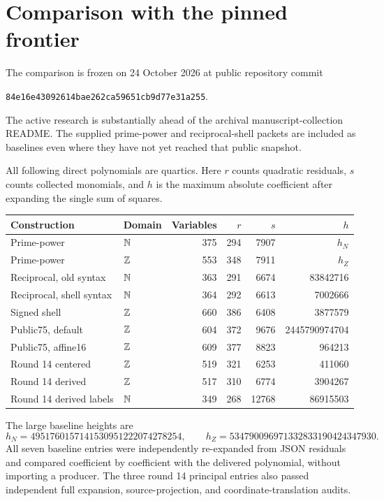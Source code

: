 \section{Comparison with the pinned frontier}
The comparison is frozen on 24 October 2026 at public repository commit
\begin{center}\small\texttt{84e16e43092614bae262ca59651cb9d77e31a255}.\end{center} The active research is substantially ahead of the archival manuscript-collection README. The supplied prime-power and reciprocal-shell packets are included as baselines even where they have not yet reached that public snapshot.

All following direct polynomials are quartics. Here $r$ counts quadratic residuals, $s$ counts collected monomials, and $h$ is the maximum absolute coefficient after expanding the single sum of squares.
\begin{center}\small
\begin{tabular}{@{}llrrrr@{}}\toprule
Construction & Domain & Variables & $r$ & $s$ & $h$\\\midrule
Prime-power & $\mathbb N$ &375&294&7907&$h_N$\\
Prime-power & $\mathbb Z$ &553&348&7911&$h_Z$\\
Reciprocal, old syntax & $\mathbb N$ &363&291&6674&83842716\\
Reciprocal, shell syntax & $\mathbb N$ &364&292&6613&7002666\\
Signed shell & $\mathbb Z$ &660&386&6408&3877579\\
Public75, default & $\mathbb Z$ &604&372&9676&2445790974704\\
Public75, affine16 & $\mathbb Z$ &609&377&8823&964213\\\midrule
Round 14 centered & $\mathbb Z$ &519&321&6253&411060\\
Round 14 derived & $\mathbb Z$ &517&310&6774&3904267\\
Round 14 derived labels & $\mathbb N$ &349&268&12768&86915503\\\bottomrule
\end{tabular}\end{center}
The large baseline heights are
\[
 h_N=4951760157141530951222074278254,\qquad
 h_Z=534790096971332833190424347930.
\]
All seven baseline entries were independently re-expanded from JSON residuals and compared coefficient by coefficient with the delivered polynomial, without importing a producer. The three round 14 principal entries also passed independent full expansion, source-projection, and coordinate-translation audits.

